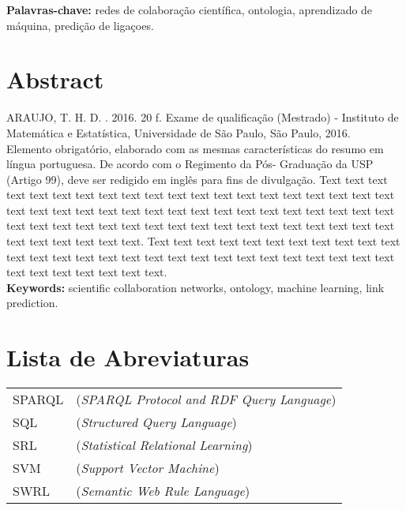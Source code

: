 \documentclass[11pt,twoside,a4paper]{book}
\begin{document}
\noindent \textbf{Palavras-chave:} redes de colaboração científica, ontologia, aprendizado de máquina, predição de ligaçoes.

\chapter*{Abstract}
\noindent ARAUJO, T. H. D. \textbf{\mydocumenttitle}.
2016. 20 f.
Exame de qualificação (Mestrado) - Instituto de Matemática e Estatística,
Universidade de São Paulo, São Paulo, 2016.
\\


Elemento obrigatório, elaborado com as mesmas características do resumo em
língua portuguesa. De acordo com o Regimento da Pós- Graduação da USP (Artigo
99), deve ser redigido em inglês para fins de divulgação.
Text text text text text text text text text text text text text text text text
text text text text text text text text text text text text text text text text
text text text text text text text text text text text text text text text text
text text text text text text text text text text text text.
Text text text text text text text text text text text text text text text text
text text text text text text text text text text text text text text text text
text text text.
\\

\noindent \textbf{Keywords:} scientific collaboration networks, ontology, machine learning, link prediction.

\tableofcontents    %

\chapter{Lista de Abreviaturas}
\begin{tabular}{ll}
        SPARQL      & (\textit{SPARQL Protocol and RDF Query Language})\\
        SQL         & (\textit{Structured Query Language})\\
        SRL         & (\textit{Statistical Relational Learning})\\
        SVM         & (\textit{Support Vector Machine})\\
        SWRL        & (\textit{Semantic Web Rule Language})\\
\end{tabular}
\end{document}

